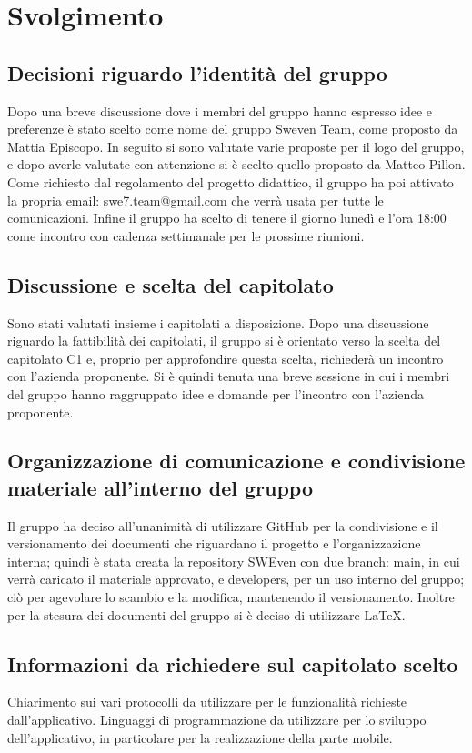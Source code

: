 \documentclass[12pt, a4paper,table]{article}
\begin{document}
	\section{Svolgimento}
		\subsection{Decisioni riguardo l'identità del gruppo}
		Dopo una breve discussione dove i membri del gruppo hanno espresso idee e preferenze è stato scelto come nome del gruppo Sweven Team, come proposto da Mattia Episcopo. In seguito si sono valutate varie proposte per il logo del gruppo, e dopo averle valutate con attenzione si è scelto quello proposto da Matteo Pillon. Come richiesto dal regolamento del progetto didattico, il gruppo ha poi attivato la propria email: swe7.team@gmail.com che verrà usata per tutte le comunicazioni. Infine il gruppo ha scelto di tenere il giorno lunedì e l'ora 18:00 come incontro con cadenza settimanale per le prossime riunioni.
		\subsection{Discussione e scelta del capitolato}
		Sono stati valutati insieme i capitolati a disposizione. Dopo una discussione riguardo la fattibilità dei capitolati, il gruppo si è orientato verso la scelta del capitolato C1 e, proprio per approfondire questa scelta, richiederà un incontro con l'azienda proponente. Si è quindi tenuta una breve sessione in cui i membri del gruppo hanno raggruppato idee e domande per l'incontro con l'azienda proponente.
		\subsection{Organizzazione di comunicazione e condivisione materiale all'interno del gruppo}
		Il gruppo ha deciso all'unanimità di utilizzare GitHub per la condivisione e il versionamento dei documenti che riguardano il progetto e l'organizzazione interna; quindi è stata creata la repository SWEven con due branch: main, in cui verrà caricato il materiale approvato, e developers, per un uso interno del gruppo; ciò per agevolare lo scambio e la modifica, mantenendo il versionamento. Inoltre per la stesura dei documenti del gruppo si è deciso di utilizzare \LaTeX .
		\subsection{Informazioni da richiedere sul capitolato scelto}
		Chiarimento sui vari protocolli da utilizzare per le funzionalità richieste dall'applicativo.
		Linguaggi di programmazione da utilizzare per lo sviluppo dell'applicativo, in particolare per la realizzazione della parte mobile.
\end{document}
